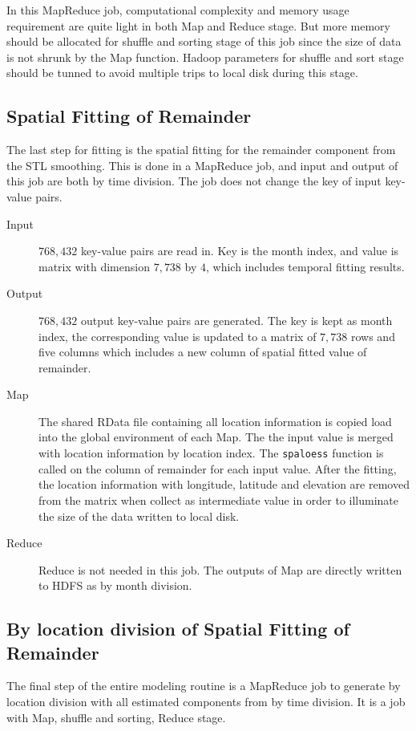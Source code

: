 In this MapReduce job, computational complexity and memory usage requirement are 
quite light in both Map and Reduce stage. But more memory should be allocated for
shuffle and sorting stage of this job since the size of data is not shrunk by
the Map function. Hadoop parameters for shuffle and sort stage should be tunned 
to avoid multiple trips to local disk during this stage. 

\subsection{Spatial Fitting of Remainder}

The last step for fitting is the spatial fitting for the remainder component from
the STL smoothing. This is done in a MapReduce job, and input and output of this
job are both by time division. The job does not change the key of input key-value
pairs.

\begin{description}
\item[Input] $768,432$ key-value pairs are read in. Key is the month index, and 
value is matrix with dimension $7,738$ by $4$, which includes temporal fitting 
results.
\item[Output] $768,432$ output key-value pairs are generated. The key is kept as
month index, the corresponding value is updated to a matrix of $7,738$ rows 
and five columns which includes a new column of spatial fitted value of remainder.
\item[Map] The shared RData file containing all location information is copied
load into the global environment of each Map. The the input value is merged with
location information by location index. The \texttt{spaloess} function is called
on the column of remainder for each input value. After the fitting, the location
information with longitude, latitude and elevation are removed from the matrix
when collect as intermediate value in order to illuminate the size of the data
written to local disk.
\item[Reduce] Reduce is not needed in this job. The outputs of Map are directly
written to HDFS as by month division.
\end{description}

\subsection{By location division of Spatial Fitting of Remainder}

The final step of the entire modeling routine is a MapReduce job to generate by
location division with all estimated components from by time division. It is a
job with Map, shuffle and sorting, Reduce stage.

